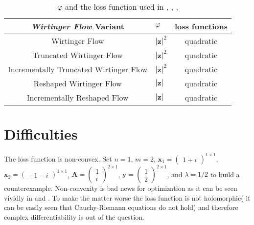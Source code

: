 \begin{table}
	\centering
	\begin{tabular}{||c l c||} 
	 \hline
	 \emph{Wirtinger Flow} Variant 			& $\varphi$ 						& loss functions\\ [0.5ex] 
	 \hline\hline
	 Wirtinger Flow 			 			& $\left|\boldsymbol{z}\right|^2$ 	& quadratic 	\\ 
	 Truncated Wirtinger Flow   			& $\left|\boldsymbol{z}\right|^2$ 	& quadratic 	\\
	 Incrementally Truncated Wirtinger Flow & $\left|\boldsymbol{z}\right|^2$  	& quadratic 	\\
	 Reshaped Wirtinger Flow 				& $\left|\boldsymbol{z}\right|$ 	& quadratic 	\\
	 Incrementally Reshaped Flow 			& $\left|\boldsymbol{z}\right|$ 	& quadratic 	\\ [1ex] 
	 \hline
	\end{tabular}
	\caption{$\varphi$ and the loss function used in \cite{wirtinger_flow_cadnes}, \cite{truncated_wirtinger_flow}, \cite{incrementaly_truncated_wirtinger_flow}, \cite{reshaped_and_incrementally_reshaped_wirtinger_flow}}
	\label{tab:formulation}
	\end{table}
\section{Difficulties}

The loss function is non-convex. Set $n=1$, $m=2$, $\boldsymbol{x}_1 = \begin{pmatrix}1+i\end{pmatrix}^{1 \times 1}$, 
$\boldsymbol{x}_2 = \begin{pmatrix}-1-i\end{pmatrix}^{1 \times 1}$, $\boldsymbol{A}=\begin{pmatrix}1\\i \end{pmatrix}^{2 \times 1}$, 
$\boldsymbol{y}=\begin{pmatrix}1\\2 \end{pmatrix}^{2 \times 1}$, and $\lambda=1/2$ to build a counterexample. Non-convexity is bad news for 
optimization as it can be seen vividly in \cite{convex_optimization_boyd} and \cite{numerical_optimization_wright}. To make the matter worse the loss function is not 
holomorphic( it can be easily seen that Cauchy-Riemann equations\cite{papa_rudin} do not hold) and therefore complex differentiability 
is out of the question\cite{papa_rudin}.

